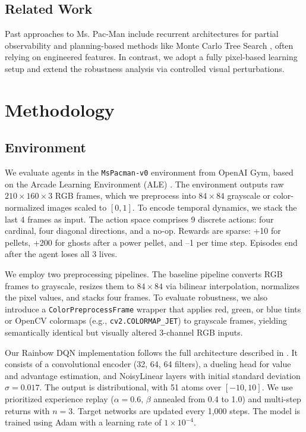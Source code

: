 \documentclass{article}
\begin{document}
\subsection{Related Work}
Past approaches to Ms. Pac-Man include recurrent architectures for partial observability \cite{toromanoff2019deep} and planning-based methods like Monte Carlo Tree Search \cite{pieters2016monte}, often relying on engineered features. In contrast, we adopt a fully pixel-based learning setup and extend the robustness analysis via controlled visual perturbations.

\section{Methodology}

\subsection{Environment}

We evaluate agents in the \texttt{MsPacman-v0} environment from OpenAI Gym, based on the Arcade Learning Environment (ALE) \cite{ale}. The environment outputs raw $210 \times 160 \times 3$ RGB frames, which we preprocess into $84 \times 84$ grayscale or color-normalized images scaled to $[0, 1]$. To encode temporal dynamics, we stack the last 4 frames as input. The action space comprises 9 discrete actions: four cardinal, four diagonal directions, and a no-op. Rewards are sparse: +10 for pellets, +200 for ghosts after a power pellet, and –1 per time step. Episodes end after the agent loses all 3 lives.

We employ two preprocessing pipelines. The baseline pipeline converts RGB frames to grayscale, resizes them to $84 \times 84$ via bilinear interpolation, normalizes the pixel values, and stacks four frames. To evaluate robustness, we also introduce a \texttt{ColorPreprocessFrame} wrapper that applies red, green, or blue tints or OpenCV colormaps (e.g., \texttt{cv2.COLORMAP\_JET}) to grayscale frames, yielding semantically identical but visually altered 3-channel RGB inputs.

Our Rainbow DQN implementation follows the full architecture described in \cite{hessel2018rainbow}. It consists of a convolutional encoder (32, 64, 64 filters), a dueling head for value and advantage estimation, and NoisyLinear layers with initial standard deviation $\sigma=0.017$. The output is distributional, with 51 atoms over $[-10, 10]$. We use prioritized experience replay ($\alpha = 0.6$, $\beta$ annealed from 0.4 to 1.0) and multi-step returns with $n = 3$. Target networks are updated every 1,000 steps. The model is trained using Adam with a learning rate of $1 \times 10^{-4}$.
\end{document}
